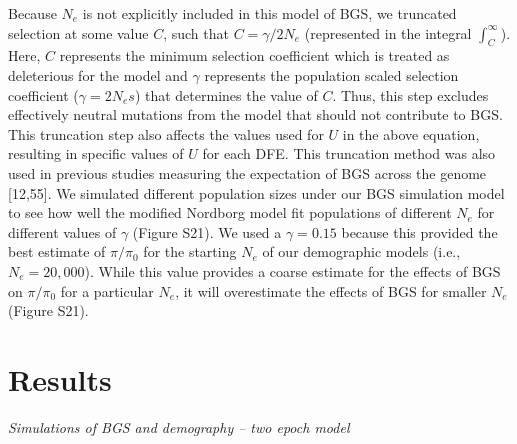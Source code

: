 \documentclass[9pt,twocolumn,twoside]{rilabRxiv}
\begin{document}
Because $N_e$ is not explicitly included in this model of BGS, we truncated selection at some value $C$,
such that $C = \gamma/2N_e$
(represented in the integral $\int^{\infty}_C$). Here, $C$ represents the minimum selection coefficient which is treated as deleterious for the model and $\gamma$ represents the population scaled selection coefficient ($\gamma = 2N_es$) that determines the value of $C$. 
Thus, this step excludes effectively neutral mutations from the model that should not contribute to BGS. 
This truncation step also affects the values used for $U$ in
the above equation, resulting in specific values of $U$ for each DFE.
This truncation method was also used in previous studies measuring the expectation of BGS across the genome [12,55]. 
We simulated different population sizes under our BGS simulation model to see how well the modified Nordborg model fit populations of different $N_e$ for different values of $\gamma$ (Figure
S21). 
We used a $\gamma = 0.15$ because this provided the best estimate of $\pi/\pi_0$ for the starting $N_e$ of our demographic models (i.e., $N_e = 20,000$). 
While this value provides a coarse estimate for the effects of BGS on $\pi/\pi_0$ for a particular $N_e$, it will overestimate the effects of BGS for
smaller $N_e$ (Figure S21).

\section{Results}


\emph{Simulations of BGS and demography -- two epoch model}
\end{document}
